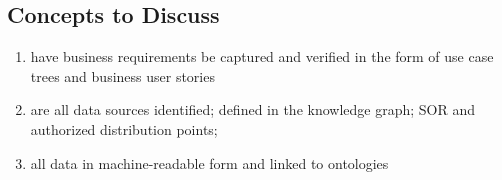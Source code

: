 \subsection*{Concepts to Discuss}

\begin{enumerate}

  \item have business requirements be captured and verified in the form of use case trees and business user stories
  \item are all data sources identified; defined in the knowledge graph; SOR and authorized distribution points;
  \item all data in machine-readable form and linked to ontologies

\end{enumerate}
